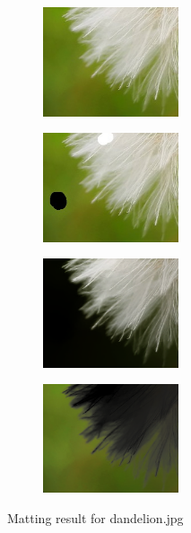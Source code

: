 \documentclass[11pt,letterpaper]{article}
\begin{document}
\begin{figure}[h!]
  \centering
  \begin{subfigure}{0.24\textwidth}
    \centering
    \includegraphics[width=4cm]{./result/dandelion/dandelion.jpg}
    \caption{}
  \end{subfigure}
  \begin{subfigure}{0.24\textwidth}
    \centering
    \includegraphics[width=4cm]{./result/dandelion/dandelion_m.jpg}
    \caption{}
  \end{subfigure}
  \begin{subfigure}{0.24\textwidth}
    \centering
    \includegraphics[width=4cm]{./result/dandelion/dandelion_foreground.png}
    \caption{}
  \end{subfigure}
  \begin{subfigure}{0.24\textwidth}
    \centering
    \includegraphics[width=4cm]{./result/dandelion/dandelion_background.png}
    \caption{}
  \end{subfigure}    
  \caption {Matting result for dandelion.jpg}
\end{figure}
\end{document}
